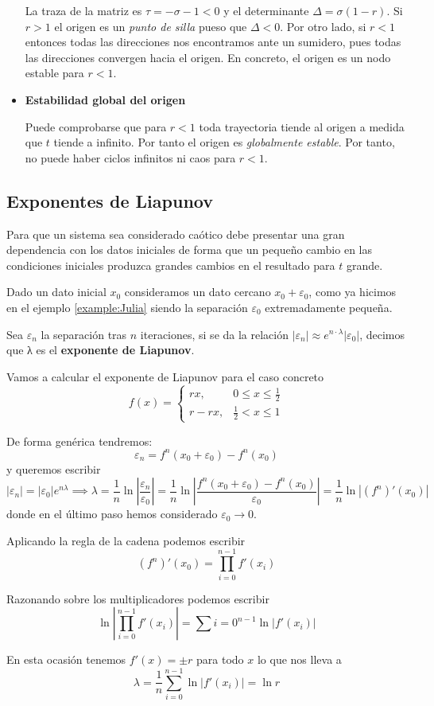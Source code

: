 \begin{itemize}
La traza de la matriz es $τ=-σ-1<0$ y el determinante $Δ = σ(1-r)$. Si $r>1$ el origen es un \emph{punto de silla} pueso que $Δ<0$. Por otro lado, si $r<1$ entonces todas las direcciones nos encontramos ante un sumidero, pues todas las direcciones convergen hacia el origen. En concreto, el origen es un nodo estable para $r<1$.

\item \textbf{Estabilidad global del origen}

Puede comprobarse que para $r<1$ toda trayectoria tiende al origen a medida que $t$ tiende a infinito. Por tanto el origen es \emph{globalmente estable}. Por tanto, no puede haber ciclos infinitos ni caos para $r<1$.

\end{itemize}

\subsection{Exponentes de Liapunov}
Para que un sistema sea considerado caótico debe presentar una gran dependencia con los datos iniciales de forma que un pequeño cambio en las condiciones iniciales produzca grandes cambios en el resultado para $t$ grande.

\begin{definition}
Dado un dato inicial $x_0$ consideramos un dato cercano $x_0+ε_0$, como ya hicimos en el ejemplo \ref{example:Julia} siendo la separación $ε_0$ extremadamente pequeña.

Sea $ε_n$ la separación tras $n$ iteraciones, si se da la relación $|ε_n|\approx e^{n\cdot λ}|ε_0|$, decimos que λ es el \textbf{exponente de Liapunov}.
\end{definition}

\begin{example}
Vamos a calcular el exponente de Liapunov para el caso concreto
\[f(x) = \left\{ \begin{array}{ll}
rx, & 0 \leq x \leq \frac{1}{2}\\
r-rx, & \frac{1}{2} < x \leq 1
\end{array}\right.\]

De forma genérica tendremos:
\[ε_n = f^n(x_0+ε_0)-f^n(x_0) \]
y queremos escribir
\[|ε_n| = |ε_0| e^{nλ} \implies λ = \frac{1}{n} \ln\left| \frac{ε_n}{ε_0}\right| = \frac{1}{n}\ln \left|\frac{f^n(x_0+ε_0)-f^n(x_0)}{ε_0} \right| = \frac{1}{n}\ln \left|(f^n)'(x_0) \right|\]
donde en el último paso hemos considerado $ε_0 \to 0$.

Aplicando la regla de la cadena podemos escribir
\[(f^n)'(x_0) = \prod_{i=0}^{n-1}f'(x_i) \]

Razonando sobre los multiplicadores podemos escribir
\[\ln \left|\prod_{i=0}^{n-1}f'(x_i)\right| = \sum{i=0}^{n-1}\ln |f'(x_i)| \]

En esta ocasión tenemos $f'(x)=\pm r$ para todo $x$ lo que nos lleva a
\[λ= \frac{1}{n}\sum_{i=0}^{n-1}\ln |f'(x_i)| = \ln r\]
\end{example}

